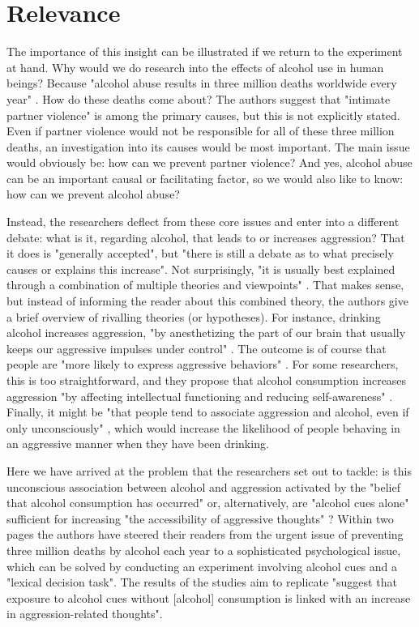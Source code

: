 \documentclass[twocolumn, serif, authordate, reflection]{jote-article}
\begin{document}
{}
\section*{Relevance}



The importance of this insight can be illustrated if we return to the experiment at hand. Why would we do research into the effects of alcohol use in human beings? Because "alcohol abuse results in three million deaths worldwide every year"  \parencite[p. 9]{Leboeuf2020}. How do these deaths come about? The authors suggest that "intimate partner violence" is among the primary causes, but this is not explicitly stated. Even if partner violence would not be responsible for all of these three million deaths, an investigation into its causes would be most important. The main issue would obviously be: how can we prevent partner violence? And yes, alcohol abuse can be an important causal or facilitating factor, so we would also like to know: how can we prevent alcohol abuse?

Instead, the researchers deflect from these core issues and enter into a different debate: what is it, regarding alcohol, that leads to or increases aggression? That it does is "generally accepted", but "there is still a debate as to what precisely causes or explains this increase". Not surprisingly, "it is usually best explained through a combination of multiple theories and viewpoints"  \parencite[p. 10]{Leboeuf2020}. That makes sense, but instead of informing the reader about this combined theory, the authors give a brief overview of rivalling theories (or hypotheses). For instance, drinking alcohol increases aggression, "by anesthetizing the part of our brain that usually keeps our aggressive impulses under control"  \parencite[p. 10]{Leboeuf2020}. The outcome is of course that people are 
"more likely to express aggressive behaviors"  \parencite[p. 10]{Leboeuf2020}. For some researchers, this is too straightforward, and they propose that alcohol consumption increases aggression "by affecting intellectual functioning and reducing self-awareness"  \parencite[p. 10]{Leboeuf2020}. Finally, it might be "that people tend to associate aggression and alcohol, even if only unconsciously" \parencite[p. 10]{Leboeuf2020}, which would increase the likelihood of people behaving in an aggressive manner when they have been drinking.

Here we have arrived at the problem that the researchers set out to tackle: is this unconscious association between alcohol and aggression activated by the "belief that alcohol consumption has occurred" or, alternatively, are "alcohol cues alone" sufficient for increasing "the accessibility of aggressive thoughts"  \parencite[p. 10]{Leboeuf2020}? Within two pages the authors have steered their readers from the  urgent issue of preventing three million deaths by alcohol each year to a sophisticated psychological issue, which can be solved by conducting an experiment involving alcohol cues and a "lexical decision task". The results of the studies \textcite[p. 10]{Leboeuf2020} aim to replicate "suggest that exposure to alcohol cues without [alcohol] consumption is linked with an increase in aggression-related thoughts".
\end{document}
